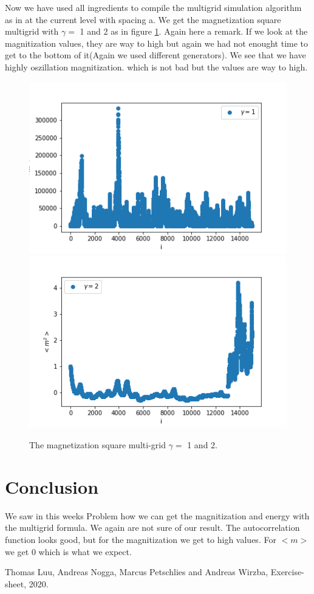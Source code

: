 \documentclass[11pt, a4paper, DIV=12]{scrartcl}
\begin{document}
Now we have used all ingredients to compile the multigrid simulation algorithm as in \cite{exercise-sheet} at the current level with spacing a. We get the magnetization square multigrid with $ \gamma = $ 1 and 2 as in figure \ref{fig:grid}. Again here a remark. If we look at the magnitization values, they are way to high but again we had not enought time to get to the bottom of it(Again we used different generators). We see that we have highly oszillation magnitization. which is not bad but the values are way to high.
\begin{figure}[H]
	\centering
	\includegraphics[width=0.6\linewidth]{magnitization_square_multigrid_gamma1.png}\includegraphics[width=0.6\linewidth]{magnitization_square_multigrid_gamma2.png}
	\caption{The magnetization square multi-grid $\gamma =$ 1 and 2.}
	\label{fig:grid}
\end{figure}



\section{Conclusion}
We saw in this weeks Problem how we can get the magnitization and energy with the multigrid formula. We again are not sure of our result. The autocorrelation function looks good, but for the magnitization we get to high values. For $<m>$ we get 0 which is what we expect. 
	
	
\begin{thebibliography}{12}
	Thomas Luu, Andreas Nogga, Marcus Petschlies and  Andreas Wirzba, Exercise-sheet, 2020. 
\end{thebibliography}	
\end{document}
